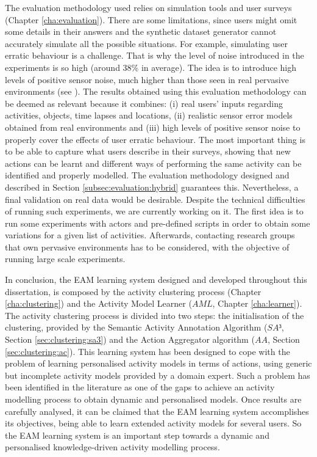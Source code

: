 The evaluation methodology used relies on simulation tools and user surveys (Chapter \ref{cha:evaluation}). There are some limitations, since users might omit some details in their answers and the synthetic dataset generator cannot accurately simulate all the possible situations. For example, simulating user erratic behaviour is a challenge. That is why the level of noise introduced in the experiments is so high (around 38\% in average). The idea is to introduce high levels of positive sensor noise, much higher than those seen in real pervasive environments (see \cite{Chen2012}). The results obtained using this evaluation methodology can be deemed as relevant because it combines: (i) real users' inputs regarding activities, objects, time lapses and locations, (ii) realistic sensor error models obtained from real environments and (iii) high levels of positive sensor noise to properly cover the effects of user erratic behaviour. The most important thing is to be able to capture what users describe in their surveys, showing that new actions can be learnt and different ways of performing the same activity can be identified and properly modelled. The evaluation methodology designed and described in Section \ref{subsec:evaluation:hybrid} guarantees this. Nevertheless, a final validation on real data would be desirable. Despite the technical difficulties of running such experiments, we are currently working on it. The first idea is to run some experiments with actors and pre-defined scripts in order to obtain some variations for a given list of activities. Afterwards, contacting research groups that own pervasive environments has to be considered, with the objective of running large scale experiments.

In conclusion, the EAM learning system designed and developed throughout this dissertation, is composed by the activity clustering process (Chapter \ref{cha:clustering}) and the Activity Model Learner ($AML$, Chapter \ref{cha:learner}). The activity clustering process is divided into two steps: the initialisation of the clustering, provided by the Semantic Activity Annotation Algorithm ($SA³$, Section \ref{sec:clustering:sa3}) and the Action Aggregator algorithm ($AA$, Section \ref{sec:clustering:ac}). This learning system has been designed to cope with the problem of learning personalised activity models in terms of actions, using generic but incomplete activity models provided by a domain expert. Such a problem has been identified in the literature as one of the gaps to achieve an activity modelling process to obtain dynamic and personalised models. Once results are carefully analysed, it can be claimed that the EAM learning system accomplishes its objectives, being able to learn extended activity models for several users. So the EAM learning system is an important step towards a dynamic and personalised knowledge-driven activity modelling process. 